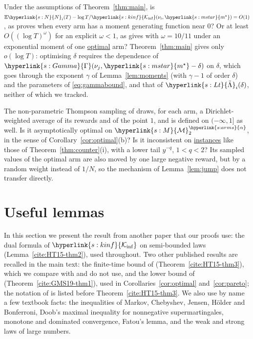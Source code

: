 \documentclass[11pt]{article}
\newcommand{\E}{\mathbb{E}}
\newcommand{\sy}[2]{{\hyperlink{#1}{#2}}}
\newcommand{\term}[2]{\hyperlink{#1}{#2}}
\newcommand{\Mm}{\sy{s:M}{\mathcal{M}}}
\newcommand{\arms}{\sy{s:arms}{\alpha}}
\newcommand{\ms}{\sy{s:mstar}{m^{\star}}}
\newcommand{\Kinf}{\sy{s:kinf}{\mathcal{K}_{\inf}}}
\newcommand{\Np}{\sy{s:N}{N}}
\newcommand{\Gam}{\sy{s:Gamma}{\Gamma}}
\newcommand{\Lt}{\sy{s:Lt}{\tilde{\Lambda}}}
\begin{document}
\begin{openquestion}\label{oq:second-order}
Under the assumptions of Theorem~\ref{thm:main}, is
$\E \Np_i(T)-\log T/\Kinf(\nu_i,\ms)=O(1)$, as \citet[Theorem~5]{HT15} proves when every arm has a
moment generating function near $0$? Or at least $O((\log T)^{\omega})$ for an explicit $\omega<1$,
as \citet[Corollary~4]{HT15} gives with $\omega=10/11$ under an exponential moment of one \term{w:optimal}{optimal} arm?
Theorem~\ref{thm:main} gives only $o(\log T)$: optimising $\delta$ requires the dependence of
$\Gam(\nu_j,\ms-\delta)$ on $\delta$, which goes through the exponent $\gamma$ of
Lemma~\ref{lem:moments} (with $\gamma-1$ of order $\delta$) and the parameters of
\eqref{eq:gammabound}, and that of $\Lt_i(\delta)$, neither of which we tracked.
\end{openquestion}

\begin{openquestion}\label{oq:thompson}
The non-parametric Thompson sampling of \citet[Section~3]{RH20} draws, for each arm,
a Dirichlet-weighted average of its rewards and of the point $1$, and is defined on
$(-\infty,1]$ as well. Is it asymptotically optimal on $\Mm_2^\arms$, in the sense of
Corollary~\ref{cor:optimal}(b)? Is it inconsistent on \term{w:instance}{instances} like those of
Theorem~\ref{thm:counter}(i), with a lower tail $y^{-q}$, $1<q<2$? Its sampled values of the optimal
arm are also moved by one large negative reward, but by a random weight instead of $1/N$, so the
mechanism of Lemma~\ref{lem:jump} does not transfer directly.
\end{openquestion}


\appendix

\section{Useful lemmas}\label{sec:cited}

In this section we present the result from another paper that our proofs use: the dual formula of
$\Kinf$ on semi-bounded laws (Lemma~\ref{cite:HT15-thm2}), used throughout. Two other published
results are recalled in the main text: the finite-time bound of \citet{HT15}
(Theorem~\ref{cite:HT15-thm3}), which we compare with and do not use, and the lower bound of
\citet{GMS19} (Theorem~\ref{cite:GMS19-thm1}), used in Corollaries~\ref{cor:optimal}
and~\ref{cor:pareto}; the notation of \citet{HT15} is listed before Theorem~\ref{cite:HT15-thm3}. We
also use by name a few textbook facts: the inequalities of Markov, Chebyshev, Jensen, H\"older and
Bonferroni, Doob's maximal inequality for nonnegative supermartingales, monotone and dominated
convergence, Fatou's lemma, and the weak and strong laws of large numbers.
\end{document}
